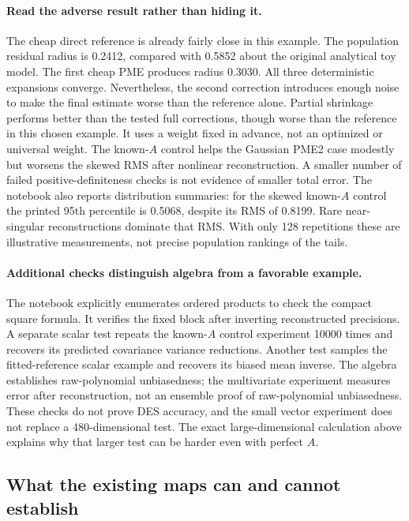 \documentclass[11pt]{article}
\begin{document}
\paragraph{Read the adverse result rather than hiding it.}
The cheap direct reference is already fairly close in this example. The
population residual radius is 0.2412, compared with 0.5852 about the
original analytical toy model. The first cheap PME produces radius 0.3030.
All three deterministic expansions converge. Nevertheless, the second
correction introduces enough noise to make the final estimate worse than
the reference alone. Partial shrinkage performs better than the tested
full corrections, though worse than the reference in this chosen example.
It uses a weight fixed in advance, not an optimized or universal weight.
The known-$A$ control helps the Gaussian PME2 case modestly but worsens
the skewed RMS after nonlinear reconstruction. A smaller number of failed
positive-definiteness checks is not evidence of smaller total error.
The notebook also reports distribution summaries: for the skewed
known-$A$ control the printed 95th percentile is 0.5068, despite its RMS
of 0.8199.
Rare near-singular reconstructions dominate that RMS. With only 128
repetitions these are illustrative measurements, not precise population
rankings of the tails.

\paragraph{Additional checks distinguish algebra from a favorable example.}
The notebook explicitly enumerates ordered products to check the compact
square formula. It verifies the fixed block after inverting reconstructed
precisions. A separate scalar test repeats the known-$A$ control experiment
10000 times and recovers its predicted covariance variance reductions.
Another test samples the fitted-reference scalar example and recovers its
biased mean inverse. The algebra establishes raw-polynomial unbiasedness; the multivariate
experiment measures error after reconstruction, not an ensemble proof of
raw-polynomial unbiasedness. These checks do
not prove DES accuracy, and the small vector experiment does not replace a
480-dimensional test. The exact large-dimensional calculation above
explains why that larger test can be harder even with perfect $A$.

\subsection{What the existing maps can and cannot establish}
\end{document}
